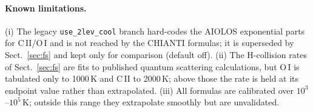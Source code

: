 \documentclass[english,a4paper]{my_memo}
\begin{document}
\paragraph{Known limitations.}
(i) The legacy \texttt{use\_2lev\_cool} branch hard-codes the AIOLOS
exponential parts for C\,II/O\,I and is not reached by the CHIANTI
formulas; it is superseded by Sect.~\ref{sec:fs} and kept only for
comparison (default off).
(ii) The H-collision rates of Sect.~\ref{sec:fs} are fits to published
quantum scattering calculations, but O\,I is tabulated only to 1000\,K
and C\,II to 2000\,K; above those the rate is held at its endpoint value
rather than extrapolated.
(iii) All formulas are calibrated over $10^3$--$10^5$\,K; outside this
range they extrapolate smoothly but are unvalidated.
\end{document}
